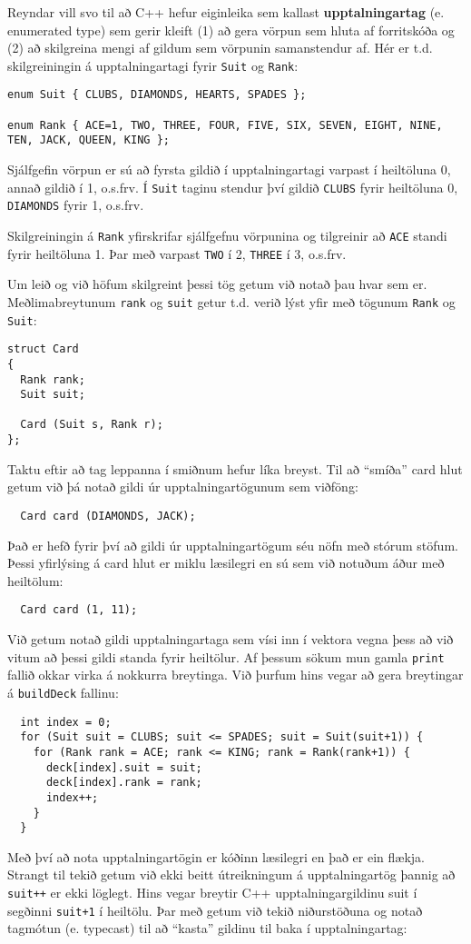 Reyndar vill svo til að C++ hefur eiginleika sem kallast {\bf upptalningartag} (e. enumerated type)
sem gerir kleift (1) að gera vörpun sem hluta af forritskóða og (2) að skilgreina mengi af gildum sem vörpunin samanstendur af.
Hér er t.d. skilgreiningin á upptalningartagi fyrir {\tt Suit} og {\tt Rank}:

\begin{verbatim}
enum Suit { CLUBS, DIAMONDS, HEARTS, SPADES };

enum Rank { ACE=1, TWO, THREE, FOUR, FIVE, SIX, SEVEN, EIGHT, NINE,
TEN, JACK, QUEEN, KING };
\end{verbatim}
%
Sjálfgefin vörpun er sú að fyrsta gildið í upptalningartagi varpast í heiltöluna 0, annað gildið í 1, o.s.frv.
Í {\tt Suit} taginu stendur því gildið {\tt CLUBS} fyrir heiltöluna 0, {\tt DIAMONDS} fyrir 1, o.s.frv.

Skilgreiningin á {\tt Rank} yfirskrifar sjálfgefnu vörpunina og tilgreinir að {\tt ACE} standi fyrir heiltöluna 1.
Þar með varpast {\tt TWO} í 2,  {\tt THREE} í 3, o.s.frv.

Um leið og við höfum skilgreint þessi tög getum við notað þau hvar sem er.
Meðlimabreytunum {\tt rank} og {\tt suit} getur t.d. verið lýst yfir með tögunum {\tt Rank} og {\tt Suit}:

\begin{verbatim}
struct Card
{
  Rank rank;
  Suit suit;

  Card (Suit s, Rank r);
};
\end{verbatim}
%
Taktu eftir að tag leppanna í smiðnum hefur líka breyst.
Til að ``smíða'' card hlut getum við þá notað gildi úr upptalningartögunum sem viðföng:

\begin{verbatim}
  Card card (DIAMONDS, JACK);
\end{verbatim}
%
Það er hefð fyrir því að gildi úr upptalningartögum séu nöfn með stórum stöfum.
Þessi yfirlýsing á card hlut er miklu læsilegri en sú sem við notuðum áður með heiltölum:

\begin{verbatim}
  Card card (1, 11);
\end{verbatim}
%
Við getum notað gildi upptalningartaga sem vísi inn í vektora vegna þess að við vitum 
að þessi gildi standa fyrir heiltölur.
Af þessum sökum mun gamla {\tt print} fallið okkar virka á nokkurra breytinga.
Við þurfum hins vegar að gera breytingar á {\tt buildDeck} fallinu:

\begin{verbatim}
  int index = 0;
  for (Suit suit = CLUBS; suit <= SPADES; suit = Suit(suit+1)) {
    for (Rank rank = ACE; rank <= KING; rank = Rank(rank+1)) {
      deck[index].suit = suit;
      deck[index].rank = rank;
      index++;
    }
  }
\end{verbatim}
%
Með því að nota upptalningartögin er kóðinn læsilegri en það er ein flækja.
Strangt til tekið getum við ekki beitt útreikningum á upptalningartög þannig að {\tt suit++} er ekki löglegt.
Hins vegar breytir C++ upptalningargildinu suit í segðinni {\tt suit+1} í heiltölu.
Þar með getum við tekið niðurstöðuna og notað tagmótun (e. typecast) til að ``kasta'' gildinu til baka í upptalningartag: 

